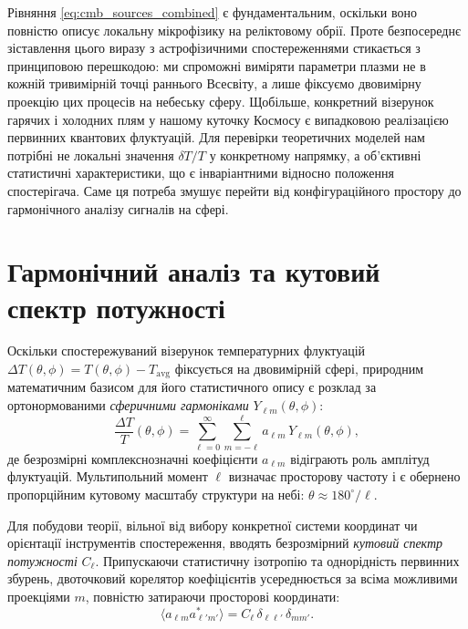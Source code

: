 Рівняння \eqref{eq:cmb_sources_combined} є фундаментальним, оскільки воно повністю описує локальну мікрофізику на реліктовому обрії. Проте безпосереднє зіставлення цього виразу з астрофізичними спостереженнями стикається з принциповою перешкодою: ми спроможні виміряти параметри плазми не в кожній тривимірній точці раннього Всесвіту, а лише фіксуємо двовимірну проекцію цих процесів на небеську сферу. Щобільше, конкретний візерунок гарячих і холодних плям у нашому куточку Космосу є випадковою реалізацією первинних квантових флуктуацій. Для перевірки теоретичних моделей нам потрібні не локальні значення $\delta T / T$ у конкретному напрямку, а об'єктивні статистичні характеристики, що є інваріантними відносно положення спостерігача. Саме ця потреба змушує перейти від конфігураційного простору до гармонічного аналізу сигналів на сфері.

\section{Гармонічний аналіз та кутовий спектр потужності}
\label{subsec:harmonic_analysis}

Оскільки спостережуваний візерунок температурних флуктуацій $\Delta T(\theta,\phi) = T(\theta,\phi) - T_\text{avg} $ фіксується на двовимірній сфері, природним математичним базисом для його статистичного опису є розклад за ортонормованими \emph{сферичними гармоніками} $Y_{\ell m}(\theta,\phi)$:
\begin{equation}\label{eq:spherical_decomp_integrated}
    \frac{\Delta T}{T}(\theta,\phi) = \sum_{\ell=0}^{\infty}\sum_{m=-\ell}^{\ell} a_{\ell m}\,Y_{\ell m}(\theta,\phi),
\end{equation}
де безрозмірні комплекснозначні коефіцієнти $a_{\ell m}$ відіграють роль амплітуд флуктуацій. Мультипольний момент $\ell$ визначає просторову частоту і є обернено пропорційним кутовому масштабу структури на небі: $\theta \approx 180^\circ/\ell$.

Для побудови теорії, вільної від вибору конкретної системи координат чи орієнтації інструментів спостереження, вводять безрозмірний \emph{кутовий спектр потужності} $C_\ell$. Припускаючи статистичну ізотропію та однорід\-ність первинних збурень, двоточковий корелятор коефіцієнтів усереднюється за всіма можливими проекціями $m$, повністю затираючи просторові координати:
\begin{equation}
    \langle a_{\ell m} a_{\ell' m'}^* \rangle = C_\ell \, \delta_{\ell \ell'} \, \delta_{m m'}.
\end{equation}

